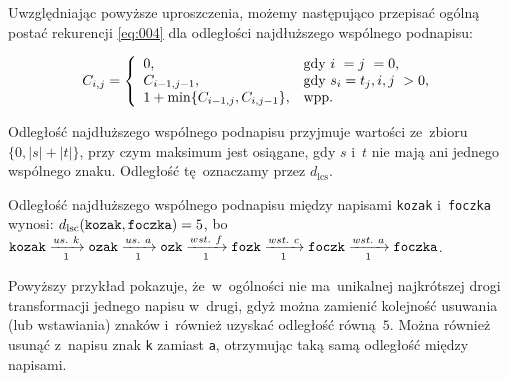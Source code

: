 \documentclass{praca1}
\begin{document}
\begin{definition}
Uwzględniając powyższe uproszczenia, możemy następująco przepisać ogólną postać rekurencji \eqref{eq:004} dla odległości najdłuższego wspólnego podnapisu:

\begin{equation*}
C_{i,j} = \left\{
\begin{array}{l l}     
    0, & \text{gdy } i~= j~= 0, \\
    C_{i-1, j-1}, & \text{gdy } s_i = t_j, i, j~> 0,  \\
    1 + \min\{C_{i-1, j}, C_{i, j-1}\}, & \text{wpp.} \\    
\end{array}\right.
\end{equation*}
\end{definition}


Odległość najdłuższego wspólnego podnapisu przyjmuje wartości ze~zbioru $\{0, |s|+|t|\}$, przy czym maksimum jest osiągane, gdy $s$ i~$t$ nie mają ani jednego wspólnego znaku. Odległość tę~oznaczamy przez $d_{\mathrm{lcs}}$.

\begin{example}
Odległość najdłuższego wspólnego podnapisu między napisami \verb|kozak| i~\verb|foczka| wynosi: $d_{\mathrm{lsc}}(\verb|kozak|, \verb|foczka|) = 5$, bo~$\verb|kozak|\xrightarrow[1]{us.\ k} \verb|ozak| \xrightarrow[1]{us.\ a} \verb|ozk| \xrightarrow[1]{wst.\ f} \verb|fozk| \xrightarrow[1]{wst.\ c} \verb|foczk| \xrightarrow[1]{wst.\ a} \verb|foczka|$.
\end{example}

Powyższy przykład pokazuje, że~w~ogólności nie ma~unikalnej najkrótszej drogi transformacji jednego napisu w~drugi, gdyż można zamienić kolejność usuwania (lub wstawiania) znaków i~również uzyskać odległość równą~$5$. Można również usunąć z~napisu znak \verb|k| zamiast \verb|a|, otrzymując taką samą odległość między napisami.
\end{document}
